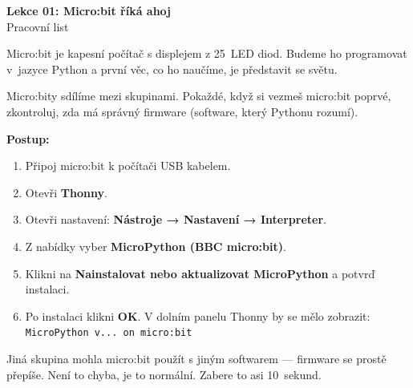 \newcommand{\lekce}{Lekce 01 -- Pracovní list}




\begin{center}
  {\Large\bfseries\textcolor{microbit-blue}{Lekce 01: Micro:bit říká ahoj}}\\[4pt]
  {\large Pracovní list}
\end{center}

\medskip\noindent
Micro:bit je kapesní počítač s displejem z 25~LED diod. Budeme ho programovat
v~jazyce Python a první věc, co ho naučíme, je představit se světu.

\begin{ukol}

Micro:bity sdílíme mezi skupinami. Pokaždé, když si vezmeš micro:bit poprvé,
zkontroluj, zda má správný firmware (software, který Pythonu rozumí).

\textbf{Postup:}
\begin{enumerate}
  \item Připoj micro:bit k počítači USB kabelem.
  \item Otevři \textbf{Thonny}.
  \item Otevři nastavení: \textbf{Nástroje → Nastavení → Interpreter}.
  \item Z nabídky vyber \textbf{MicroPython (BBC micro:bit)}.
  \item Klikni na \textbf{Nainstalovat nebo aktualizovat MicroPython} a potvrď instalaci.
  \item Po instalaci klikni \textbf{OK}. V dolním panelu Thonny by se mělo zobrazit:\\
        \texttt{MicroPython v...\ on micro:bit}
\end{enumerate}

\begin{tcolorbox}[colback=yellow!12, colframe=orange!70!black,
                  fonttitle=\small\bfseries, title=Proč to dělám?]
  \small
  Jiná skupina mohla micro:bit použít s jiným softwarem — firmware se prostě
  přepíše. Není to chyba, je to normální. Zabere to asi 10~sekund.
\end{tcolorbox}

\end{ukol}


